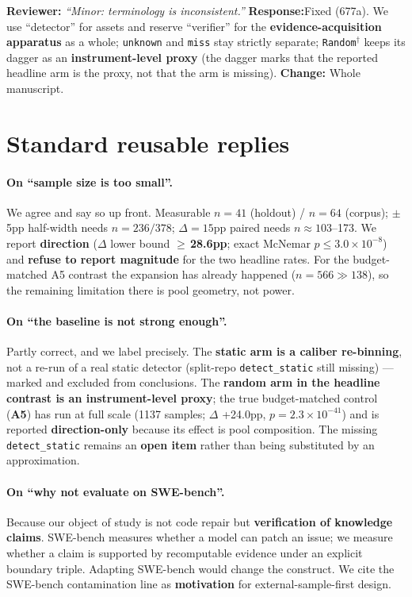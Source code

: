 \documentclass[11pt]{article}
\newcommand{\rev}[1]{\textbf{\color{blue}Reviewer:} \emph{``#1''}}
\newcommand{\resp}{\textbf{\color{red}Response:}}
\newcommand{\chg}[1]{\textbf{Change:} #1}
\begin{document}
\rev{Minor: terminology is inconsistent.}
\resp Fixed (677a). We use ``detector'' for assets and reserve ``verifier'' for the
\textbf{evidence-acquisition apparatus} as a whole; \texttt{unknown} and \texttt{miss} stay strictly
separate; \texttt{Random}$^\dagger$ keeps its dagger as an \textbf{instrument-level proxy} (the
dagger marks that the reported headline arm is the proxy, not that the arm is missing).
\chg{Whole manuscript.}

\section*{Standard reusable replies}

\paragraph{On ``sample size is too small''.}
We agree and say so up front. Measurable $n{=}41$ (holdout) / $n{=}64$ (corpus); $\pm$5pp half-width
needs $n{=}236/378$; $\Delta{=}15$pp paired needs $n\approx103$--173. We report \textbf{direction}
($\Delta$ lower bound $\ge$\,\textbf{28.6pp}; exact McNemar $p\le3.0\times10^{-8}$) and
\textbf{refuse to report magnitude} for the two headline rates. For the budget-matched A5 contrast
the expansion has already happened ($n{=}566 \gg 138$), so the remaining limitation there is pool
geometry, not power.

\paragraph{On ``the baseline is not strong enough''.}
Partly correct, and we label precisely. The \textbf{static arm is a caliber re-binning}, not a re-run
of a real static detector (split-repo \texttt{detect\_static} still missing) --- marked and excluded
from conclusions. The \textbf{random arm in the headline contrast is an instrument-level proxy}; the
true budget-matched control (\textbf{A5}) has run at full scale (1137 samples; $\Delta$ +24.0pp,
$p{=}2.3\times10^{-41}$) and is reported \textbf{direction-only} because its effect is pool
composition. The missing \texttt{detect\_static} remains an \textbf{open item} rather than being
substituted by an approximation.

\paragraph{On ``why not evaluate on SWE-bench''.}
Because our object of study is not code repair but \textbf{verification of knowledge claims}.
SWE-bench measures whether a model can patch an issue; we measure whether a claim is supported by
recomputable evidence under an explicit boundary triple. Adapting SWE-bench would change the
construct. We cite the SWE-bench contamination line as \textbf{motivation} for
external-sample-first design.
\end{document}
